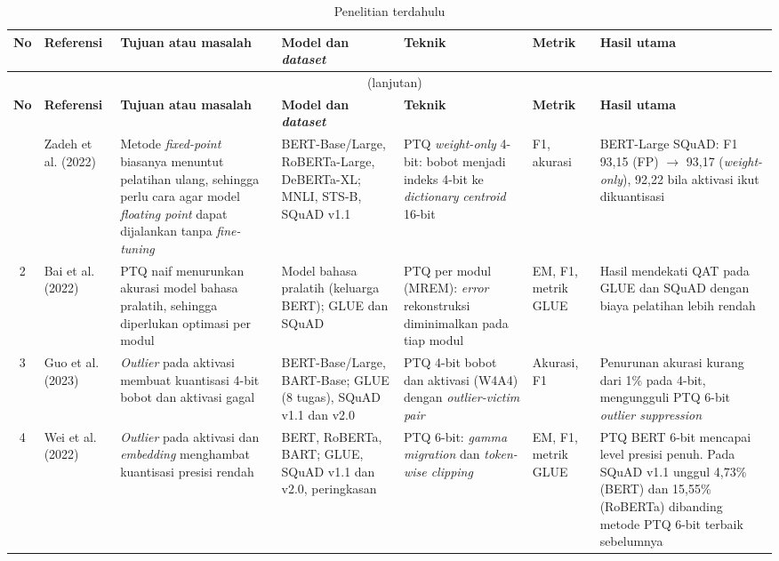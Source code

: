 {\setlength{\tabcolsep}{3pt}
\captionsetup[longtable]{font=normalsize}
\begingroup\scriptsize
\renewcommand{\arraystretch}{1.15}
\begin{longtable}{@{}c>{\raggedright\arraybackslash}p{1.55cm}>{\raggedright\arraybackslash}p{1.95cm}>{\raggedright\arraybackslash}p{2.45cm}>{\raggedright\arraybackslash}p{1.95cm}>{\raggedright\arraybackslash}p{1.25cm}>{\raggedright\arraybackslash}p{2.55cm}@{}}
  \caption{Penelitian terdahulu}
  \label{tab:penelitian-terdahulu} \\
  \hline
  \textbf{No} & \textbf{Referensi} & \textbf{Tujuan atau masalah} & \textbf{Model dan \textit{dataset}} & \textbf{Teknik} & \textbf{Metrik} & \textbf{Hasil utama} \\
  \hline
  \endfirsthead
  \hline
  \multicolumn{7}{c}{\tablename~\thetable{} (lanjutan)} \\
  \hline
  \textbf{No} & \textbf{Referensi} & \textbf{Tujuan atau masalah} & \textbf{Model dan \textit{dataset}} & \textbf{Teknik} & \textbf{Metrik} & \textbf{Hasil utama} \\
  \hline
  \endhead
  \hline
  \endlastfoot
  1 & Zadeh et al. (2022) & Metode \textit{fixed-point} biasanya menuntut pelatihan ulang, sehingga perlu cara agar model \textit{floating point} dapat dijalankan tanpa \textit{fine-tuning} & BERT-Base/Large, RoBERTa-Large, DeBERTa-XL; MNLI, STS-B, SQuAD v1.1 & PTQ \textit{weight-only} 4-bit: bobot menjadi indeks 4-bit ke \textit{dictionary} \textit{centroid} 16-bit & F1, akurasi & BERT-Large SQuAD: F1 93,15 (FP) $\rightarrow$ 93,17 (\textit{weight-only}), 92,22 bila aktivasi ikut dikuantisasi \\
  2 & Bai et al. (2022) & PTQ naif menurunkan akurasi model bahasa pralatih, sehingga diperlukan optimasi per modul & Model bahasa pralatih (keluarga BERT); GLUE dan SQuAD & PTQ per modul (MREM): \textit{error} rekonstruksi diminimalkan pada tiap modul & EM, F1, metrik GLUE & Hasil mendekati QAT pada GLUE dan SQuAD dengan biaya pelatihan lebih rendah \\
  3 & Guo et al. (2023) & \textit{Outlier} pada aktivasi membuat kuantisasi 4-bit bobot dan aktivasi gagal & BERT-Base/Large, BART-Base; GLUE (8 tugas), SQuAD v1.1 dan v2.0 & PTQ 4-bit bobot dan aktivasi (W4A4) dengan \textit{outlier-victim pair} & Akurasi, F1 & Penurunan akurasi kurang dari 1\% pada 4-bit, mengungguli PTQ 6-bit \textit{outlier suppression} \\
  4 & Wei et al. (2022) & \textit{Outlier} pada aktivasi dan \textit{embedding} menghambat kuantisasi presisi rendah & BERT, RoBERTa, BART; GLUE, SQuAD v1.1 dan v2.0, peringkasan & PTQ 6-bit: \textit{gamma migration} dan \textit{token-wise clipping} & EM, F1, metrik GLUE & PTQ BERT 6-bit mencapai level presisi penuh. Pada SQuAD v1.1 unggul 4,73\% (BERT) dan 15,55\% (RoBERTa) dibanding metode PTQ 6-bit terbaik sebelumnya \\

\end{longtable}}
